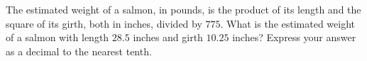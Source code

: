 The estimated weight of a salmon, in pounds, is the product of its length and the square of its girth, both in inches, divided by $775$. What is the estimated weight of a salmon with length $28.5$ inches and girth $10.25$ inches? Express your answer as a decimal to the nearest tenth.
